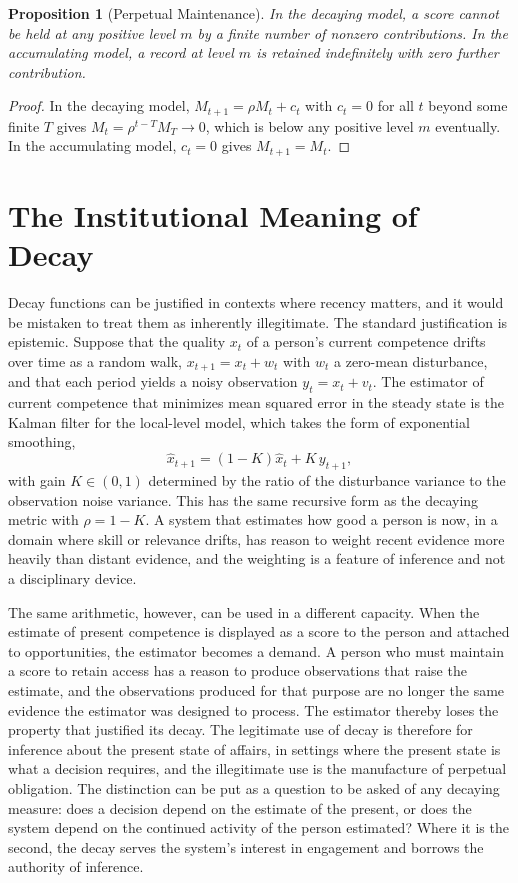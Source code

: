 \documentclass[11pt]{report}
\newtheorem{proposition}[theorem]{Proposition}
\theoremstyle{definition}
\theoremstyle{remark}
\begin{document}
\begin{proposition}[Perpetual Maintenance]\label{prop:maintain}
In the decaying model, a score cannot be held at any positive level $m$ by a finite number of nonzero contributions. In the accumulating model, a record at level $m$ is retained indefinitely with zero further contribution.
\end{proposition}

\begin{proof}
In the decaying model, $M_{t+1}=\rho M_t+c_t$ with $c_t=0$ for all $t$ beyond some finite $T$ gives $M_t=\rho^{t-T}M_T\to0$, which is below any positive level $m$ eventually. In the accumulating model, $c_t=0$ gives $M_{t+1}=M_t$.
\end{proof}

\section{The Institutional Meaning of Decay}

Decay functions can be justified in contexts where recency matters, and it would be mistaken to treat them as inherently illegitimate. The standard justification is epistemic. Suppose that the quality $x_t$ of a person's current competence drifts over time as a random walk, $x_{t+1}=x_t+w_t$ with $w_t$ a zero-mean disturbance, and that each period yields a noisy observation $y_t=x_t+v_t$. The estimator of current competence that minimizes mean squared error in the steady state is the Kalman filter for the local-level model, which takes the form of exponential smoothing,
\[
\hat x_{t+1}=(1-K)\hat x_t+K\,y_{t+1},
\]
with gain $K\in(0,1)$ determined by the ratio of the disturbance variance to the observation noise variance. This has the same recursive form as the decaying metric with $\rho=1-K$. A system that estimates how good a person is now, in a domain where skill or relevance drifts, has reason to weight recent evidence more heavily than distant evidence, and the weighting is a feature of inference and not a disciplinary device.

The same arithmetic, however, can be used in a different capacity. When the estimate of present competence is displayed as a score to the person and attached to opportunities, the estimator becomes a demand. A person who must maintain a score to retain access has a reason to produce observations that raise the estimate, and the observations produced for that purpose are no longer the same evidence the estimator was designed to process. The estimator thereby loses the property that justified its decay. The legitimate use of decay is therefore for inference about the present state of affairs, in settings where the present state is what a decision requires, and the illegitimate use is the manufacture of perpetual obligation. The distinction can be put as a question to be asked of any decaying measure: does a decision depend on the estimate of the present, or does the system depend on the continued activity of the person estimated? Where it is the second, the decay serves the system's interest in engagement and borrows the authority of inference.
\end{document}
